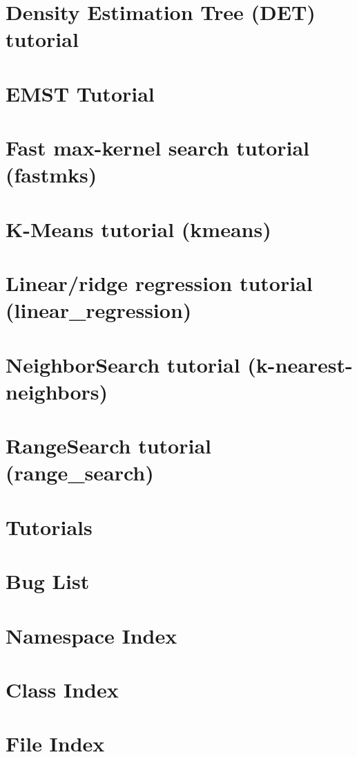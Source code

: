 \documentclass[twoside]{book}
\begin{document}
\chapter{Density Estimation Tree (D\-E\-T) tutorial}
\label{dettutorial}

\chapter{E\-M\-S\-T Tutorial}
\label{emst_tutorial}

\chapter{Fast max-\/kernel search tutorial (fastmks)}
\label{fmkstutorial}

\chapter{K-\/\-Means tutorial (kmeans)}
\label{kmtutorial}

\chapter{Linear/ridge regression tutorial (linear\-\_\-regression)}
\label{lrtutorial}

\chapter{Neighbor\-Search tutorial (k-\/nearest-\/neighbors)}
\label{nstutorial}

\chapter{Range\-Search tutorial (range\-\_\-search)}
\label{rstutorial}

\chapter{Tutorials}
\label{tutorials}

\chapter{Bug List}
\label{bug}

\chapter{Namespace Index}

\chapter{Class Index}

\chapter{File Index}

\end{document}
